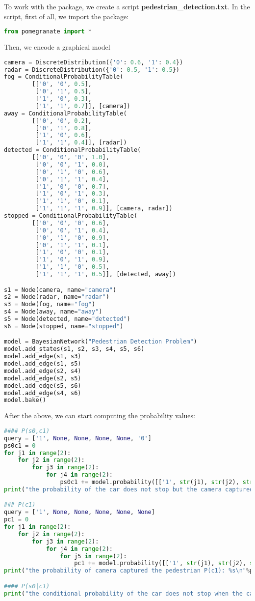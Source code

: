 To work with the package, we create a script \textbf{pedestrian\_detection.txt}. In the script, first of all, we import the package: 
\begin{lstlisting}[language=Python]
from pomegranate import *
\end{lstlisting}

Then, we encode a graphical model

\begin{lstlisting}[language=Python]
camera = DiscreteDistribution({'0': 0.6, '1': 0.4})
radar = DiscreteDistribution({'0': 0.5, '1': 0.5})
fog = ConditionalProbabilityTable(
        [['0', '0', 0.5],
         ['0', '1', 0.5],
         ['1', '0', 0.3],
         ['1', '1', 0.7]], [camera])
away = ConditionalProbabilityTable(
        [['0', '0', 0.2],
         ['0', '1', 0.8],
         ['1', '0', 0.6],
         ['1', '1', 0.4]], [radar])
detected = ConditionalProbabilityTable(
        [['0', '0', '0', 1.0],
         ['0', '0', '1', 0.0],
         ['0', '1', '0', 0.6],
         ['0', '1', '1', 0.4],
         ['1', '0', '0', 0.7],
         ['1', '0', '1', 0.3],
         ['1', '1', '0', 0.1],
         ['1', '1', '1', 0.9]], [camera, radar])
stopped = ConditionalProbabilityTable(
        [['0', '0', '0', 0.6],
         ['0', '0', '1', 0.4],
         ['0', '1', '0', 0.9],
         ['0', '1', '1', 0.1],
         ['1', '0', '0', 0.1],
         ['1', '0', '1', 0.9],
         ['1', '1', '0', 0.5],
         ['1', '1', '1', 0.5]], [detected, away])

s1 = Node(camera, name="camera")
s2 = Node(radar, name="radar")
s3 = Node(fog, name="fog")
s4 = Node(away, name="away")
s5 = Node(detected, name="detected")
s6 = Node(stopped, name="stopped")

model = BayesianNetwork("Pedestrian Detection Problem")
model.add_states(s1, s2, s3, s4, s5, s6)
model.add_edge(s1, s3)
model.add_edge(s1, s5)
model.add_edge(s2, s4)
model.add_edge(s2, s5)
model.add_edge(s5, s6)
model.add_edge(s4, s6)
model.bake()
\end{lstlisting}

After the above, we can start computing the probability values: 
\begin{lstlisting}[language=Python]
#### P(s0,c1)
query = ['1', None, None, None, None, '0']
ps0c1 = 0 
for j1 in range(2): 
    for j2 in range(2): 
        for j3 in range(2): 
            for j4 in range(2): 
                ps0c1 += model.probability([['1', str(j1), str(j2), str(j3), str(j4), '0']])
print("the probability of the car does not stop but the camera captured the pedestrian P(s0,c1): %s\n"%(ps0c1))

### P(c1)
query = ['1', None, None, None, None, None]
pc1 = 0 
for j1 in range(2): 
    for j2 in range(2): 
        for j3 in range(2): 
            for j4 in range(2): 
                for j5 in range(2): 
                    pc1 += model.probability([['1', str(j1), str(j2), str(j3), str(j4), str(j5)]])
print("the probability of camera captured the pedestrian P(c1): %s\n"%pc1)

#### P(s0|c1)
print("the conditional probability of the car does not stop when the camera captured the pedestrian P(s0|c1)): %s\n"%(ps0c1/pc1))
\end{lstlisting}

